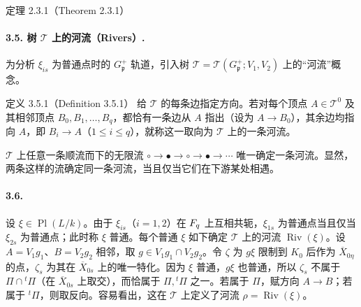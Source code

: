 \begin{originaltheorem}{定理 2.3.1（Theorem 2.3.1）}
\paragraph*{3.5. 树 $\mathcal T$ 上的河流（Rivers）.}
为分析 $\xi_{is}$ 为普通点时的 $G_{\mathfrak p}^+$ 轨道，引入树 $\mathcal T=\mathcal T(G_{\mathfrak p}^+;V_1,V_2)$ 上的“河流”概念。
\begin{originaltheorem}{定义 3.5.1（Definition 3.5.1）}
给 $\mathcal T$ 的每条边指定方向。若对每个顶点 $A\in\mathcal T^0$ 及其相邻顶点 $B_0,B_1,\ldots,B_q$，都恰有一条边从 $A$ 指出（设为 $A\longrightarrow B_0$），其余边均指向 $A$，即 $B_i\longrightarrow A$（$1\leq i\leq q$），就称这一取向为 $\mathcal T$ 上的一条河流。
\end{originaltheorem}
\begin{center}
\end{center}
$\mathcal T$ 上任意一条顺流而下的无限流
$\circ\longrightarrow\bullet\longrightarrow\circ\longrightarrow\bullet\longrightarrow\cdots$
唯一确定一条河流。显然，两条这样的流确定同一条河流，当且仅当它们在下游某处相遇。

\paragraph*{3.6.}
设 $\xi\in\operatorname{Pl}(L/k)$。由于 $\xi_{is}$（$i=1,2$）在 $F_q$ 上互相共轭，$\xi_{1s}$ 为普通点当且仅当 $\xi_{2s}$ 为普通点；此时称 $\xi$ 普通。每个普通 $\xi$ 如下确定 $\mathcal T$ 上的河流 $\operatorname{Riv}(\xi)$。设 $A=V_1g_1$、$B=V_2g_2$ 相邻，取 $g\in V_1g_1\cap V_2g_2$。令 $\zeta$ 为 $g\xi$ 限制到 $K_0$ 后作为 $\overline X_{0\eta}$ 的点，$\zeta_s$ 为其在 $\overline X_{0s}$ 上的唯一特化。因为 $\xi$ 普通，$g\xi$ 也普通，所以 $\zeta_s$ 不属于 $\Pi\cap{}^t\Pi$（在 $\overline X_{0s}$ 上取交），而恰属于 $\Pi,{}^t\Pi$ 之一。若属于 $\Pi$，赋方向 $A\longrightarrow B$；若属于 ${}^t\Pi$，则取反向。容易看出，这在 $\mathcal T$ 上定义了河流 $\rho=\operatorname{Riv}(\xi)$。


\end{originaltheorem}
